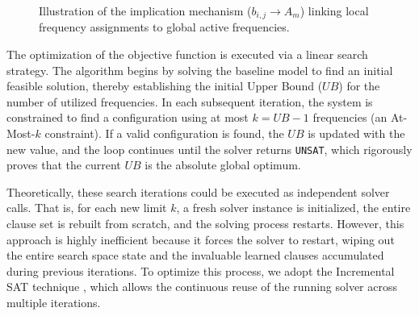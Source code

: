 \documentclass[letterpaper,journal]{IEEEtran}
\begin{document}
\begin{figure}[htbp]
\caption{Illustration of the implication mechanism ($b_{i,j} \rightarrow A_{m}$) linking local frequency assignments to global active frequencies.}
\label{fig:b_to_A_implication}
\end{figure}

The optimization of the objective function is executed via a linear search strategy. The algorithm begins by solving the baseline model to find an initial feasible solution, thereby establishing the initial Upper Bound ($UB$) for the number of utilized frequencies. In each subsequent iteration, the system is constrained to find a configuration using at most $k = UB - 1$ frequencies (an At-Most-$k$ constraint). If a valid configuration is found, the $UB$ is updated with the new value, and the loop continues until the solver returns \texttt{UNSAT}, which rigorously proves that the current $UB$ is the absolute global optimum.

Theoretically, these search iterations could be executed as independent solver calls. That is, for each new limit $k$, a fresh solver instance is initialized, the entire clause set is rebuilt from scratch, and the solving process restarts. However, this approach is highly inefficient because it forces the solver to restart, wiping out the entire search space state and the invaluable learned clauses accumulated during previous iterations. To optimize this process, we adopt the Incremental SAT technique \cite{martins2014incremental}, which allows the continuous reuse of the running solver across multiple iterations. 
\end{document}
